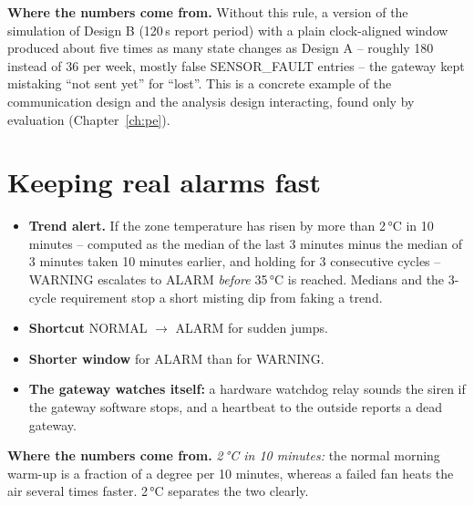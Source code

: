 \documentclass[11pt,a4paper]{report}
\newcommand{\why}[1]{\par\noindent\colorbox{gray!10}{\parbox{\dimexpr\linewidth-2\fboxsep}{\small\textbf{Where the numbers come from.} #1}}\par}
\begin{document}
\why{Without this rule, a version of the simulation of Design B (120\,s report period) with a plain clock-aligned window produced about five times as many state changes as Design A -- roughly 180 instead of 36 per week, mostly false SENSOR\_FAULT entries -- the gateway kept mistaking ``not sent yet'' for ``lost''. This is a concrete example of the communication design and the analysis design interacting, found only by evaluation (Chapter~\ref{ch:pe}).}

\section{Keeping real alarms fast}\label{sec:trend}
\begin{itemize}
  \item \textbf{Trend alert.} If the zone temperature has risen by more than 2\,°C in 10 minutes -- computed as the median of the last 3 minutes minus the median of 3 minutes taken 10 minutes earlier, and holding for 3 consecutive cycles -- WARNING escalates to ALARM \emph{before} 35\,°C is reached. Medians and the 3-cycle requirement stop a short misting dip from faking a trend.
  \item \textbf{Shortcut} NORMAL $\to$ ALARM for sudden jumps.
  \item \textbf{Shorter window} for ALARM than for WARNING.
  \item \textbf{The gateway watches itself:} a hardware watchdog relay sounds the siren if the gateway software stops, and a heartbeat to the outside reports a dead gateway.
\end{itemize}

\why{\emph{2\,°C in 10 minutes:} the normal morning warm-up is a fraction of a degree per 10 minutes, whereas a failed fan heats the air several times faster. 2\,°C separates the two clearly.}
\end{document}

